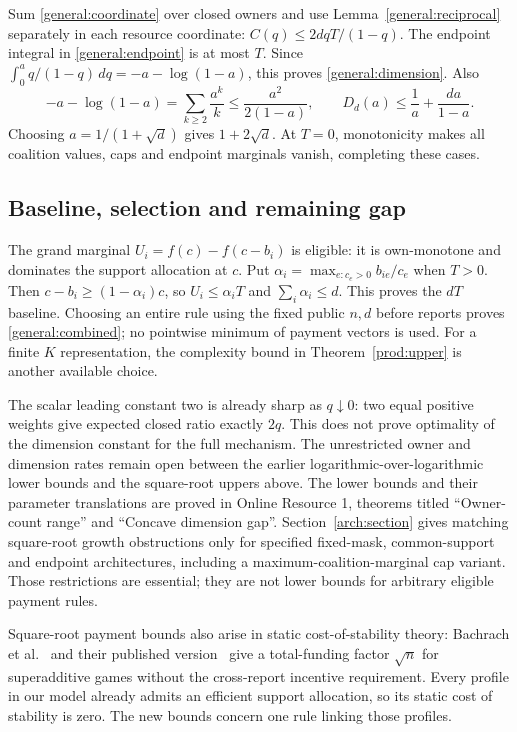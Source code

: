 \documentclass[11pt]{article}
\theoremstyle{definition}\newtheorem{definition}[theorem]{Definition}
\theoremstyle{remark}\newtheorem{remark}[theorem]{Remark}
\begin{document}
Sum \eqref{general:coordinate} over closed owners and use
Lemma~\ref{general:reciprocal} separately in each resource coordinate:
$C(q)\le 2dqT/(1-q)$. The endpoint integral in
\eqref{general:endpoint} is at most $T$. Since
$\int_0^a q/(1-q)\,dq=-a-\log(1-a)$, this proves
\eqref{general:dimension}. Also
\[
 -a-\log(1-a)=\sum_{k\ge2}\frac{a^k}{k}
 \le\frac{a^2}{2(1-a)},\qquad
 D_d(a)\le\frac1a+\frac{da}{1-a}.
\]
Choosing $a=1/(1+\sqrt d)$ gives $1+2\sqrt d$.
At $T=0$, monotonicity makes all coalition values, caps and endpoint
marginals vanish, completing these cases.

\subsection{Baseline, selection and remaining gap}
The grand marginal $U_i=f(c)-f(c-b_i)$ is eligible: it is own-monotone and
dominates the support allocation at $c$. Put
$\alpha_i=\max_{e:c_e>0}b_{ie}/c_e$ when $T>0$.
Then $c-b_i\ge(1-\alpha_i)c$, so $U_i\le\alpha_iT$ and
$\sum_i\alpha_i\le d$. This proves the $dT$ baseline.
Choosing an entire rule using the fixed public $n,d$ before reports proves
\eqref{general:combined}; no pointwise minimum of payment vectors is used.
For a finite $K$ representation, the complexity bound in
Theorem~\ref{prod:upper} is another available choice.

The scalar leading constant two is already sharp as $q\downarrow0$:
two equal positive weights give expected closed ratio exactly $2q$.
This does not prove optimality of the dimension constant for the full mechanism.
The unrestricted owner and dimension rates remain open between the earlier
logarithmic-over-logarithmic lower bounds and the square-root uppers above.
The lower bounds and their parameter translations are proved in Online
Resource 1, theorems titled ``Owner-count range'' and ``Concave dimension gap''.
Section~\ref{arch:section} gives matching square-root growth obstructions only for
specified fixed-mask, common-support and endpoint architectures, including
a maximum-coalition-marginal cap variant. Those restrictions are essential;
they are not lower bounds for arbitrary eligible payment rules.

Square-root payment bounds also arise in static cost-of-stability theory:
Bachrach et al.~\cite[Theorem 3.5]{Bachrach2009} and their published
version~\cite[Theorem 7]{Bachrach} give a total-funding factor $\sqrt n$ for
superadditive games without the cross-report incentive requirement. Every profile in our
model already admits an efficient support allocation, so its static cost of
stability is zero. The new bounds concern one rule linking those profiles.
\end{document}
